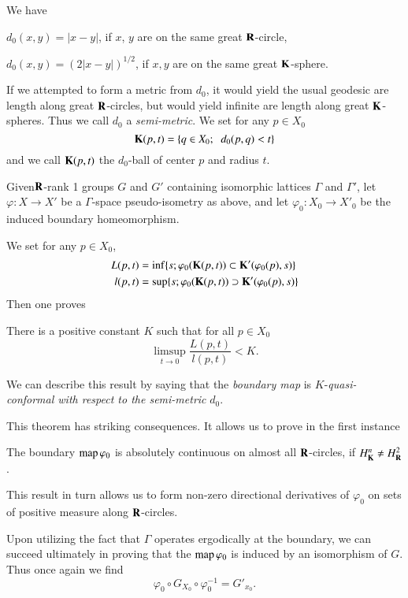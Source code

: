We have

$d_0 (x,y) = |x-y|$, if $x$, $y$ are on the same great $\mathbf{R}$-circle,

$d_0 (x,y) = (2 |x-y|)^{1/2}$, if $x,y$ are on the same great $\mathbf{K}$-sphere.

If we attempted to form a metric from $d_0$, it would yield the usual geodesic are length along great $\mathbf{R}$-circles, but would yield infinite are length along great $\mathbf{K}$-spheres. Thus we call $d_0$ a \textit{semi-metric}. We set for any $p\in X_0$
$$
\mathbf{K} (p, t) = \{q \in X_0 ; \;\; d_0 (p, q) < t\}
$$
and we call $\mathbf{K} (p,t)$ the $d_0$-ball of center $p$ and radius $t$.

Given\pageoriginale  $\mathbf{R}$-rank 1 groups $G$ and $G'$ containing isomorphic lattices $\Gamma$ and $\Gamma'$, let $\varphi: X \to X'$ be a $\Gamma$-space pseudo-isometry as above, and let $\varphi_0 : X_0 \to X'_0$ be the induced boundary homeomorphism.

We set for any $p \in X_0$,
\begin{align*}
L (p,t) & = \inf \{s; \varphi_0 (\mathbf{K} (p,t)) \subset \mathbf{K}' (\varphi_0 (p), s)\}\\
l(p,t) & = \sup \{s; \varphi_0 (\mathbf{K} (p,t)) \supset \mathbf{K}' (\varphi_0 (p), s)\}
\end{align*}
Then one proves

\begin{theorem*}
There is a positive constant $K$ such that for all $p \in X_0$
$$
{\displaystyle{\mathop{\lim\sup}_{t \to 0}}} \frac{L(p,t)}{l (p,t)} < K.
$$
\end{theorem*}

We can describe this result by saying that the \textit{boundary map} is $K$-\textit{quasi-conformal with respect to the semi-metric} $d_0$.

This theorem has striking consequences. It allows us to prove in the first instance

\begin{theorem*}
The boundary $\operatorname{map} \varphi_0$ is absolutely continuous on almost all $\mathbf{R}$-circles, if $H^n_{\mathbf{K}} \neq H^2_{\mathbf{R}}$.
\end{theorem*}

This result in turn allows us to form non-zero directional derivatives of $\varphi_0$ on sets of positive measure along $\mathbf{R}$-circles.

Upon utilizing the fact that $\Gamma$ operates ergodically at the boundary, we can succeed ultimately in proving that the $\operatorname{map} \varphi_0$ is induced by an isomorphism of $G$. Thus once again we find 
$$
\varphi_0 \circ G_{X_0} \circ \varphi^{-1}_0 = G'_{x_0}.
$$

